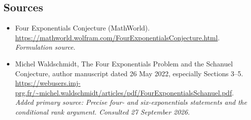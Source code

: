 \documentclass[11pt]{article}
\begin{document}
\subsection{Sources}
\begin{itemize}
\item[S1]Four Exponentials Conjecture (MathWorld).
\url{https://mathworld.wolfram.com/FourExponentialsConjecture.html}.
\textit{Formulation source.}
\item[E1]Michel Waldschmidt, The Four Exponentials Problem and the Schanuel Conjecture, author manuscript dated 26 May 2022, especially Sections 3--5.
\url{https://webusers.imj-prg.fr/~michel.waldschmidt/articles/pdf/FourExponentialsSchanuel.pdf}.
\textit{Added primary source: Precise four- and six-exponentials statements and the conditional rank argument. Consulted 27 September 2026.}
\end{itemize}
\end{document}
